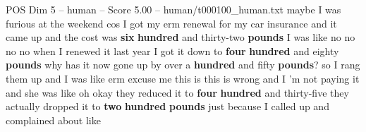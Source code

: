\begin{textsample}{POS Dim 5 – human – Score 5.00 – human/t000100\_human.txt}  \label{ex:f5_pos_010}
maybe I was furious at the weekend cos I got my erm renewal for my car insurance and it came up and the cost was \textbf{six} \textbf{hundred} and thirty-two \textbf{pounds} I was like no no no no when I renewed it last year I got it down to \textbf{four} \textbf{hundred} and eighty \textbf{pounds} why has it now gone up by over a \textbf{hundred} and fifty \textbf{pounds}? so I rang them up and I was like erm excuse me this is this is wrong and I 'm not paying it and she was like oh okay they reduced it to \textbf{four} \textbf{hundred} and thirty-five they actually dropped it to \textbf{two} \textbf{hundred} \textbf{pounds} just because I called up and complained about like

\end{textsample}
